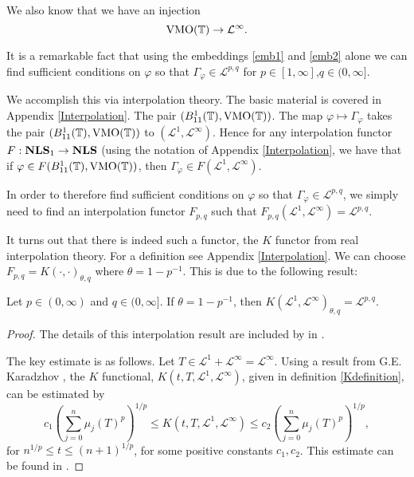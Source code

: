 We also know that we have an injection
\begin{equation}
\label{emb2}
    \VMO(\Circ) \to \mathcal{L}^\infty.
\end{equation}


It is a remarkable fact that using the embeddings \ref{emb1}
and \ref{emb2} alone we can find sufficient conditions on $\varphi$
so that $\Gamma_\varphi \in \mathcal{L}^{p,q}$ for $p\in [1,\infty]$,$q \in (0,\infty]$.

We accomplish this via interpolation theory.
The basic material is covered in Appendix \ref{Interpolation}. The pair $(B_{11}^1(\mathbb{T}),\operatorname{VMO}(\mathbb{T}))$.
The map $\varphi \mapsto \Gamma_\varphi$ takes the pair
$(B_{11}^1(\mathbb{T}),\operatorname{VMO}(\mathbb{T}))$ to $(\mathcal{L}^1,\mathcal{L}^\infty)$.
Hence for any interpolation functor $F:\mathrm{\mathbf{NLS}}_1\to\mathrm{\mathbf{NLS}}$ (using the notation
of Appendix \ref{Interpolation}, we have that if $\varphi \in F(B_{11}^1(\mathbb{T}),\operatorname{VMO}(\mathbb{T}))$,
then $\Gamma_{\varphi} \in F(\mathcal{L}^1,\mathcal{L}^\infty)$.

In order to therefore find sufficient conditions on $\varphi$ so that $\Gamma_\varphi \in \mathcal{L}^{p,q}$,
we simply need to find an interpolation functor $F_{p,q}$ such that $F_{p,q}(\mathcal{L}^1,\mathcal{L}^\infty) = \mathcal{L}^{p,q}$.

It turns out that there is indeed such a functor, the $K$ functor from real interpolation theory.
For a definition see Appendix \ref{Interpolation}. We can choose $F_{p,q} = K(\cdot,\cdot)_{\theta,q}$
where $\theta = 1-p^{-1}$. This is due to the following result:
\begin{proposition}
    Let $p \in (0,\infty)$ and $q \in (0,\infty]$. If $\theta = 1-p^{-1}$, then $K(\mathcal{L}^1,\mathcal{L}^\infty)_{\theta,q} = \mathcal{L}^{p,q}$.
\end{proposition}
\begin{proof}
    The details of this interpolation result are included by in \cite{DDP92}.
    
    The key estimate is as follows.
    Let $T \in \mathcal{L}^1+\mathcal{L}^\infty = \mathcal{L}^\infty$.
    Using a result from G.E. Karadzhov \cite{Karadzhov},
    the $K$ functional, $K(t,T,\mathcal{L}^1,\mathcal{L}^\infty)$, given in
    definition \ref{Kdefinition}, can be estimated by
    \begin{equation}
        c_1\left(\sum_{j=0}^n \mu_j(T)^p\right)^{1/p} \leq K(t,T,\mathcal{L}^1,\mathcal{L}^\infty) \leq c_2\left(\sum_{j=0}^n \mu_j(T)^p\right)^{1/p},
    \end{equation}
    for $n^{1/p} \leq t \leq (n+1)^{1/p}$, for some positive constants $c_1,c_2$. This
    estimate can be found in \cite{Karadzhov}.
\end{proof}


